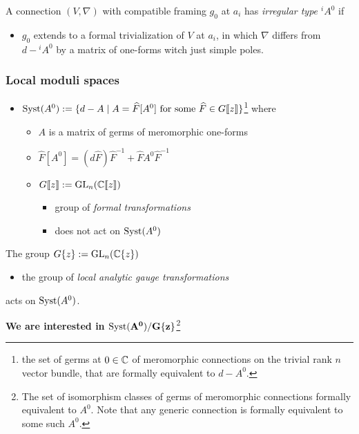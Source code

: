 \begin{defn}[2.4]
  A connection $(V,\nabla)$ with compatible framing $g_0$ at $a_i$ has
  \emph{irregular type ${}^iA^0$} if
  \begin{itemize}
    \item $g_0$ extends to a formal trivialization of $V$ at $a_i$, in which
    $\nabla$ differs from $d-{}^iA^0$ by a matrix of one-forms witch just
    simple poles.
  \end{itemize}
\end{defn}

\subsubsection{Local moduli spaces} %
\begin{defn}
  \begin{itemize}
    \item $\operatorname{Syst}(A^0):=\{d-A \mid A=\widehat{F}[A^0] \text{ for some } \widehat{F}\in
      G\llbracket z\rrbracket\}$\footnote{the set of germs at $0\in\mathbb{C}$ of
      meromorphic connections on the trivial rank $n$ vector bundle, that are
      formally equivalent to $d-A^0$.}
      where
      \begin{itemize}
        \item $A$ is a matrix of germs of meromorphic one-forms
        \item $\hat{F}[A^0]=(d\hat{F})\hat{F}^{-1}+\hat{F}A^0\hat{F}^{-1}$
        \item $G\llbracket z\rrbracket:=\operatorname{GL}_n(\mathbb{C}\llbracket z\rrbracket)$
          \begin{itemize}
            \item group of \emph{formal transformations}
            \item does not act on $\operatorname{Syst}(A^0)$
          \end{itemize}
      \end{itemize}
  \end{itemize}
  The group $G\{z\}:=\operatorname{GL}_n(\mathbb{C}\{z\})$
  \begin{itemize}
    \item the group of \emph{local analytic gauge transformations}
  \end{itemize}
  acts on $\operatorname{Syst}(A^0)$.
  \begin{center}
    \textbf{We are interested in $\bf\operatorname{Syst}(A^0)/G\{z\}$}\footnote{The set of
    isomorphism classes of germs of meromorphic connections formally equivalent
    to $A^0$. Note that any generic connection is formally equivalent to some
    such $A^0$.}
  \end{center}
\end{defn}
